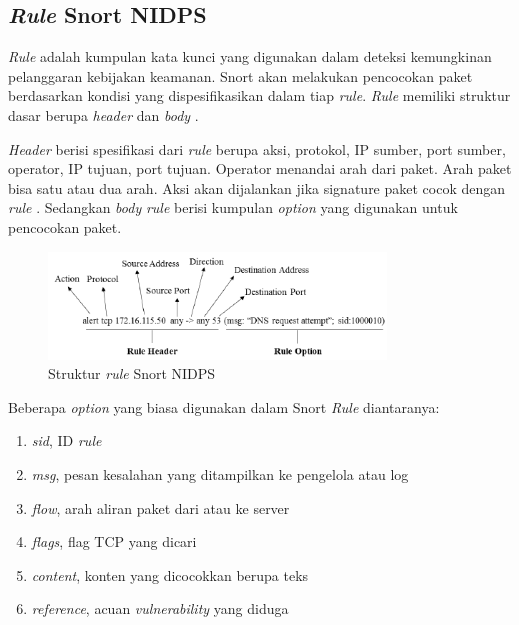   \subsection{\emph{Rule} Snort NIDPS}

    \emph{Rule} adalah kumpulan kata kunci yang digunakan dalam deteksi kemungkinan pelanggaran kebijakan keamanan. Snort akan melakukan pencocokan paket berdasarkan kondisi yang dispesifikasikan dalam tiap \emph{rule}. \emph{Rule} memiliki struktur dasar berupa \emph{header} dan \emph{body} \parencite{snort}. 

    \emph{Header} berisi spesifikasi dari  \emph{rule} berupa aksi, protokol, IP sumber, port sumber, operator, IP tujuan, port tujuan. Operator menandai arah dari paket. Arah paket bisa satu atau dua arah. Aksi akan dijalankan jika signature paket cocok dengan \emph{rule} \parencite{5358130}. Sedangkan \emph{body} \emph{rule} berisi kumpulan \emph{option} yang digunakan untuk pencocokan paket. 

    \begin{figure}[H]
      \centering
      \includegraphics[width=0.8\textwidth]{resources/rule.png}
      \caption[Struktur \emph{rule} Snort NIDPS]{Struktur \emph{rule} Snort NIDPS \parencite{khamphakdee2014}}
    \end{figure}

    Beberapa \emph{option} yang biasa digunakan dalam Snort \emph{Rule} diantaranya:
    \begin{enumerate} 
      \item \emph{sid}, ID \emph{rule}
      \item \emph{msg}, pesan kesalahan yang ditampilkan ke pengelola atau log
      \item \emph{flow}, arah aliran paket dari atau ke server
      \item \emph{flags}, flag TCP yang dicari
      \item \emph{content}, konten yang dicocokkan berupa teks
      \item \emph{reference}, acuan \emph{vulnerability} yang diduga
    \end{enumerate} 

